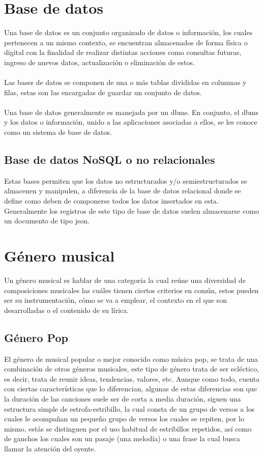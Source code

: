 \documentclass[12pt, a4paper, titlepage]{report}
\begin{document}
        \section{Base de datos}
        
        Una base de datos es un conjunto organizado de datos o información, los cuales pertenecen a un mismo contexto, se encuentran almacenados de forma física o digital con la finalidad de realizar distintas acciones como consultas futuras, ingreso de nuevos datos, actualización o eliminación de estos.\\\\
		Las bases de datos se componen de una o más tablas divididas en columnas y filas, estas son las encargadas de guardar un conjunto de datos.\\\\
		Una base de datos generalmente es manejada por un \acrfull{dbms}. En conjunto, el \acrshort{dbms} y los datos o información, unido a las aplicaciones asociadas a ellos, se les conoce como un sistema de base de datos.\cite{refQueEsBD}\par
			\subsection{Base de datos NoSQL o no relacionales}
			Estas bases permiten que los datos no estructurados y/o semiestructurados se almacenen y manipulen, a diferencia de la base de datos relacional donde se define como deben de componerse todos los datos insertados en esta. Generalmente los registros de este tipo de base de datos suelen almacenarse como un documento de tipo \acrshort{json}.\par
		
		\newpage
		\section{Género musical}
		Un género musical es hablar de una categoría la cual reúne una diversidad de composiciones musicales las cuáles tienen ciertos criterios en común, estos pueden ser su instrumentación, cómo se va a emplear, el contexto en el que son desarrolladas o el contenido de su lírica.
		
			\subsection{Género Pop}
			El género de musical popular o mejor conocido como música pop, se trata de una combinación de otros géneros musicales, este tipo de género trata de ser ecléctico, es decir, trata de reunir ideas, tendencias, valores, etc. Aunque como todo, cuenta con ciertas características que lo diferencian, algunas de estas diferencias son que la duración de las canciones suele ser de corta a media duración, siguen una estructura simple de estrofa-estribillo, la cual consta de un grupo de versos a los cuales le acompañan un pequeño grupo de versos los cuales se repiten, por lo mismo, estás se distinguen por el uso habitual de estribillos repetidos, así como de ganchos los cuales son un pasaje (una melodía) o una frase la cual busca llamar la atención del oyente.
	    
\end{document}
